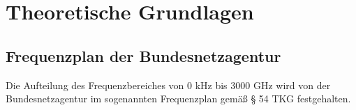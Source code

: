 
\chapter{Theoretische Grundlagen}
\section{Frequenzplan der Bundesnetzagentur}
Die Aufteilung des Frequenzbereiches von 0 kHz bis 3000 GHz wird von der Bundesnetzagentur im sogenannten Frequenzplan \cite[Bundesnetzagentur]{bundesnetzagentur-frequenzplan:2016} gemäß § 54 TKG festgehalten.
